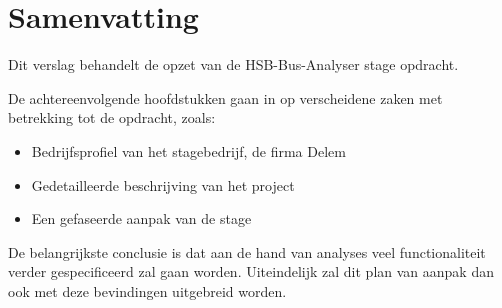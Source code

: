 \section*{Samenvatting}

Dit verslag behandelt de opzet van de HSB-Bus-Analyser stage opdracht.

De achtereenvolgende hoofdstukken gaan in op verscheidene zaken met betrekking tot de opdracht, zoals:

\begin{itemize}
\item Bedrijfsprofiel van het stagebedrijf, de firma Delem
\item Gedetailleerde beschrijving van het project
\item Een gefaseerde aanpak van de stage
\end{itemize}

De belangrijkste conclusie is dat aan de hand van analyses veel functionaliteit verder gespecificeerd zal gaan worden. Uiteindelijk zal dit plan van aanpak dan ook met deze bevindingen uitgebreid worden.

